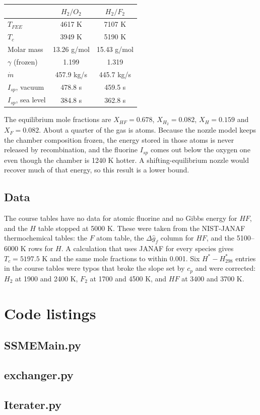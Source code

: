 \documentclass[12pt, Times New Roman]{article}
\begin{document}
    \begin{center}
        \begin{tabular}{|l|c|c|}
            \hline
             & $H_{2}/O_{2}$ & $H_{2}/F_{2}$ \\
            \hline
            $T_{FEE}$ & 4617 K & 7107 K \\
            $T_{c}$ & 3949 K & 5190 K \\
            Molar mass & 13.26 g/mol & 15.43 g/mol \\
            $\gamma$ (frozen) & 1.199 & 1.319 \\
            $\dot{m}$ & 457.9 kg/s & 445.7 kg/s \\
            $I_{sp}$, vacuum & 478.8 s & 459.5 s \\
            $I_{sp}$, sea level & 384.8 s & 362.8 s \\
            \hline
        \end{tabular}
    \end{center}

    The equilibrium mole fractions are $X_{HF} = 0.678$, $X_{H_{2}} = 0.082$, $X_{H} = 0.159$ and $X_{F} = 0.082$.
    About a quarter of the gas is atoms. Because the nozzle model keeps the chamber composition frozen, the energy stored
    in those atoms is never released by recombination, and the fluorine $I_{sp}$ comes out below the oxygen one even though
    the chamber is 1240 K hotter. A shifting-equilibrium nozzle would recover much of that energy, so this result is a lower bound.

    \subsection{Data}

    The course tables have no data for atomic fluorine and no Gibbs energy for $HF$, and the $H$ table stopped at 5000 K.
    These were taken from the NIST-JANAF thermochemical tables: the $F$ atom table, the $\Delta \hat{g}_{f}$ column for $HF$,
    and the 5100--6000 K rows for $H$. A calculation that uses JANAF for every species gives $T_{c} = 5197.5$ K and the same
    mole fractions to within 0.001. Six $H^{*}-H^{*}_{298}$ entries in the course tables were typos that broke the slope set by
    $c_{p}$ and were corrected: $H_{2}$ at 1900 and 2400 K, $F_{2}$ at 1700 and 4500 K, and $HF$ at 3400 and 3700 K.

\appendix{}
    \section{Code listings}
    \subsection{SSMEMain.py}
    
    \subsection{exchanger.py}
    
    \subsection{Iterater.py}
    
\end{document}
